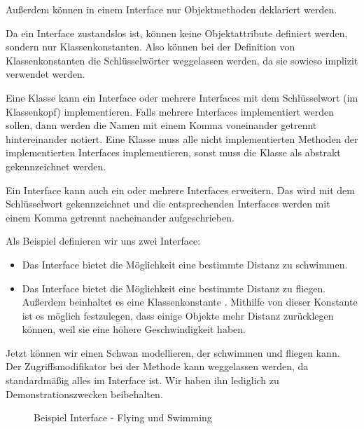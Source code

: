 \documentclass{tuda-pub}
\begin{document}
  Außerdem können in einem Interface nur Objektmethoden deklariert werden.

  \br

  Da ein Interface zustandslos ist, können keine Objektattribute definiert werden, sondern nur
  Klassenkonstanten. Also können bei der Definition von Klassenkonstanten die Schlüsselwörter
   weggelassen werden, da sie sowieso implizit verwendet werden.

  Eine Klasse kann ein Interface oder mehrere Interfaces mit dem Schlüsselwort
   (im Klassenkopf) implementieren. Falls mehrere Interfaces implementiert
  werden sollen, dann werden die Namen mit einem Komma voneinander getrennt hintereinander
  notiert. Eine Klasse muss alle nicht implementierten Methoden der implementierten Interfaces
  implementieren, sonst muss die Klasse als abstrakt gekennzeichnet werden.

  \br

  Ein Interface kann auch ein oder mehrere Interfaces erweitern. Das wird mit dem Schlüsselwort
   gekennzeichnet und die entsprechenden Interfaces werden mit einem Komma
  getrennt nacheinander aufgeschrieben.

  \clearpage
  Als Beispiel definieren wir uns zwei Interface:

  \begin{itemize}
    \item Das Interface  bietet die Möglichkeit eine bestimmte Distanz zu
    schwimmen.
    \item Das Interface  bietet die Möglichkeit eine bestimmte Distanz zu
    fliegen. Außerdem beinhaltet es eine Klassenkonstante . Mithilfe von dieser
    Konstante ist es möglich festzulegen, dass einige Objekte mehr Distanz zurücklegen können,
    weil sie eine höhere Geschwindigkeit haben.
  \end{itemize}

  Jetzt können wir einen Schwan modellieren, der schwimmen und fliegen kann. Der
  Zugriffsmodifikator bei der Methode  kann weggelassen werden, da standardmäßig
  alles im Interface  ist. Wir haben ihn lediglich zu Demonstrationszwecken
  beibehalten.

  \begin{figure}[h]
    \centering
    
    \caption{Beispiel Interface - Flying und Swimming}
    \label{fig:Interface}
  \end{figure}
\end{document}

